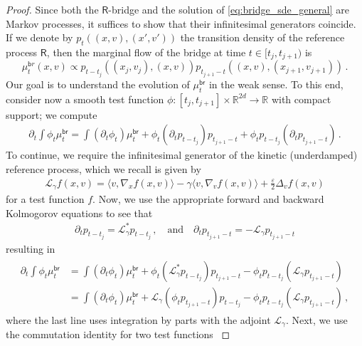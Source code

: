 \documentclass[12pt]{article}
\theoremstyle{plain}
\theoremstyle{plain}
\theoremstyle{remark}
\newcommand{\cL}{\mathcal{L}}
\newcommand{\msf}[1]{\mathsf{#1}}
\newcommand{\eps}{\varepsilon}
\newcommand{\1}{\bm{1}}
\theoremstyle{plain}
\theoremstyle{definition}
\theoremstyle{remark}
\begin{document}
\begin{proof}
Since both the $\msf R$-bridge and the solution of \eqref{eq:bridge_sde_general} are Markov processes, it suffices to show that their infinitesimal generators coincide. If we denote by $p_t((x,v),(x',v'))$ the transition density of the reference process $\msf R$, then the marginal flow of the bridge at time $t \in [t_j, t_{j+1})$ is
\begin{equation*}
\mu^{\msf br}_t(x,v) \propto
{p_{t-t_j}((x_j,v_j),(x,v))p_{t_{j+1}-t}((x,v),(x_{j+1},v_{j+1}))}\,.
\end{equation*}
Our goal is to understand the evolution of $\mu^{\msf{br}}_t$ in the weak sense. To this end, consider now a smooth test function $\phi:[t_{j},t_{j+1}]\times \mathbb{R}^{2d}\to\mathbb{R}$ with compact support; we compute
\begin{align*}
    \partial_t \int \phi_t \mu_t^{\msf{br}} = \int (\partial_t \phi_t) \mu_t^{\msf{br}} + \phi_t (\partial_t p_{t-t_j})p_{t_{j+1}-t} + \phi_t p_{t-t_j}(\partial_t p_{t_{j+1}-t})\,.
\end{align*}
To continue, we require the infinitesimal generator of the kinetic (underdamped) reference process, which we recall is given by
\begin{align*}
    \cL_\gamma f(x,v) = \langle v, \nabla_x f(x,v)\rangle - \gamma \langle v, \nabla_v f(x,v)\rangle + \frac{\eps}{2}\Delta_{v}f(x,v)
\end{align*}
for a test function $f$. Now, we use the appropriate forward and backward Kolmogorov equations to see that
\begin{align*}
\partial_t p_{t-t_j} = \cL_\gamma^* p_{t-t_j}\,, \quad \text{and} \quad \partial_t p_{t_{j+1}-t} = -\cL_\gamma p_{t_{j+1}-t}
\end{align*}
resulting in
\begin{align}
\begin{split}\label{eq_h_trans_1}
    \partial_t \int \phi_t \mu_t^{\msf{br}} &= \int (\partial_t \phi_t) \mu_t^{\msf{br}} + \phi_t ( \cL_\gamma^* p_{t-t_j})p_{t_{j+1}-t}  - \phi_t p_{t-t_j}(\cL_\gamma p_{t_{j+1}-t}) \\
    &= \int (\partial_t \phi_t) \mu_t^{\msf{br}} + \cL_\gamma (\phi_t p_{t_{j+1}-t}) p_{t-t_j}  - \phi_t p_{t-t_j}(\cL_\gamma p_{t_{j+1}-t})\,,
\end{split}
\end{align}
where the last line uses integration by parts with the adjoint $\cL_\gamma$.
Next, we use the commutation identity for two test functions \citep{bakry2014analysis}

\end{proof}
\end{document}

